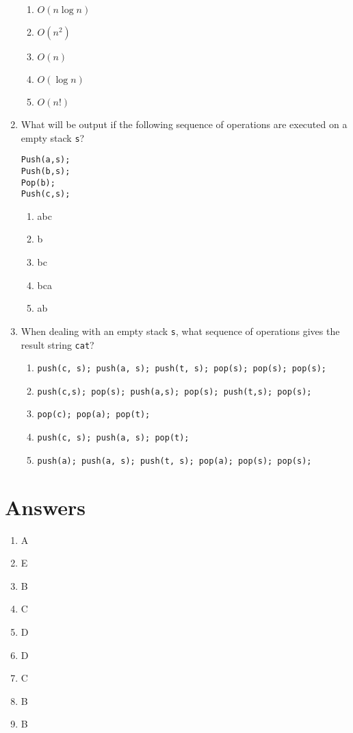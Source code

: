 \documentclass{article}
\begin{document}
\begin{enumerate}
            \begin{enumerate}
                \item $O(n \log n)$
                \item $O(n^2)$
                \item $O(n)$
                \item $O(\log n)$
                \item $O(n!)$
            \end{enumerate}
\item What will be output if the following sequence of operations are executed on a empty stack \texttt{s}?

            \begin{verbatim}
Push(a,s);
Push(b,s);
Pop(b);
Push(c,s);
            \end{verbatim}

            \begin{enumerate}
                \item abc
                \item b
                \item bc
                \item bca
                \item ab
            \end{enumerate}
\item When dealing with an empty stack \texttt{s}, what sequence of operations gives the result string \texttt{cat}?
            
            \begin{enumerate}
                \item \texttt{push(c, s); push(a, s); push(t, s); pop(s); pop(s); pop(s);}
                \item \texttt{push(c,s); pop(s); push(a,s); pop(s); push(t,s); pop(s);}
                \item \texttt{pop(c); pop(a); pop(t);}
                \item \texttt{push(c, s); push(a, s); pop(t);}
                \item \texttt{push(a); push(a, s); push(t, s); pop(a); pop(s); pop(s);}
            \end{enumerate}
\end{enumerate}
\section{Answers}
\begin{enumerate}
\item A
\item E
\item B
\item C
\item D
\item D
\item C
\item B
\item B
\end{enumerate}
\end{document}
